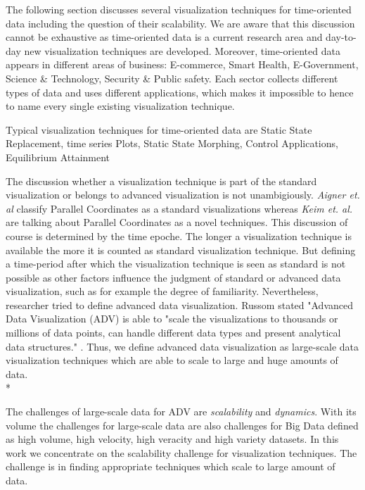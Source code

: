 The following section discusses several visualization techniques for time-oriented data including the question of their scalability. We are aware that this discussion cannot be exhaustive as time-oriented data is a current research area and day-to-day new visualization techniques are developed.
Moreover, time-oriented data appears in different areas of business: E-commerce, Smart Health, E-Government, Science \& Technology, Security \& Public safety. Each sector collects different types of data and uses different applications, which makes it impossible to hence to name every single existing visualization technique.


Typical visualization techniques for time-oriented data are 
Static State Replacement,
time series Plots,
Static State Morphing,
Control Applications,
Equilibrium Attainment

 The discussion whether a visualization technique is part of the standard visualization or belongs to advanced visualization is not unambigiously. \textit{Aigner et. al} classify Parallel Coordinates as a standard visualizations\cite{Aigner2011} whereas \textit{Keim et. al.} \cite{Keim} are talking about Parallel Coordinates as a novel techniques. This discussion of course is determined by the time epoche. The longer a visualization technique is available the more it is counted as standard visualization technique. But defining a time-period after which the visualization technique is seen as standard is not possible as other factors influence the judgment of standard or advanced data visualization, such as for example the degree of familiarity. Nevertheless, researcher tried to define advanced data visualization. Russom stated "Advanced Data Visualization (ADV) is able to "scale the visualizations to thousands or millions of data points, can handle different data types and present analytical data structures." \cite{Russom2011}. Thus, we define advanced data visualization as large-scale data visualization techniques which are able to scale to large and huge amounts of data. 
 \\*


 The challenges of large-scale data for ADV are \textit{scalability} and \textit{dynamics}\cite{Wang2015}. With its volume the challenges for large-scale data are also challenges for Big Data defined as high volume, high velocity, high veracity and high variety datasets\cite{Wang2015}. In this work we concentrate on the scalability challenge for visualization techniques. The challenge is in finding appropriate techniques\cite{Aigner2008,Keim2005} which scale to large amount of data.
 \fi
 
